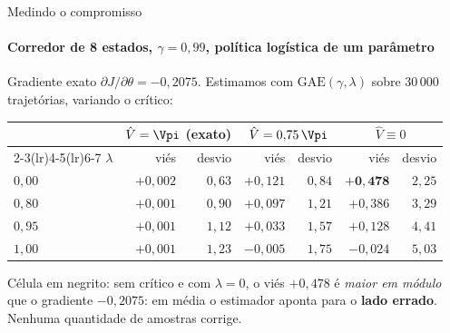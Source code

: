 \documentclass[aspectratio=169, 10pt]{beamer}
\newcommand{\thv}{\theta}
\newcommand{\Vhat}{\hat{V}}
\begin{document}
\begin{frame}{Medindo o compromisso}
  \framesubtitle{Corredor de 8 estados, $\gamma = 0{,}99$, política logística de um parâmetro}

  Gradiente exato $\partial J/\partial\thv = -0{,}2075$. Estimamos com
  $\mathrm{GAE}(\gamma,\lambda)$ sobre $30\,000$ trajetórias, variando o crítico:

  \begin{center}\small
  \begin{tabular}{@{}lrrrrrr@{}}
    \toprule
    & \multicolumn{2}{c}{$\Vhat = \Vpi$ (exato)}
    & \multicolumn{2}{c}{$\Vhat = 0{,}75\,\Vpi$}
    & \multicolumn{2}{c}{$\Vhat \equiv 0$}\\
    \cmidrule(lr){2-3}\cmidrule(lr){4-5}\cmidrule(lr){6-7}
    $\lambda$ & viés & desvio & viés & desvio & viés & desvio\\
    \midrule
    $0{,}00$ & $+0{,}002$ & $0{,}63$ & $+0{,}121$ & $0{,}84$ & $\mathbf{+0{,}478}$ & $2{,}25$\\
    $0{,}80$ & $+0{,}001$ & $0{,}90$ & $+0{,}097$ & $1{,}21$ & $+0{,}386$ & $3{,}29$\\
    $0{,}95$ & $+0{,}001$ & $1{,}12$ & $+0{,}033$ & $1{,}57$ & $+0{,}128$ & $4{,}41$\\
    $1{,}00$ & $+0{,}001$ & $1{,}23$ & $-0{,}005$ & $1{,}75$ & $-0{,}024$ & $5{,}03$\\
    \bottomrule
  \end{tabular}
  \end{center}

  \begin{alertabox}
    Célula em negrito: sem crítico e com $\lambda=0$, o viés $+0{,}478$ é \emph{maior
    em módulo} que o gradiente $-0{,}2075$: em média o estimador aponta para o
    \textbf{lado errado}. Nenhuma quantidade de amostras corrige.
  \end{alertabox}
\end{frame}
\end{document}

